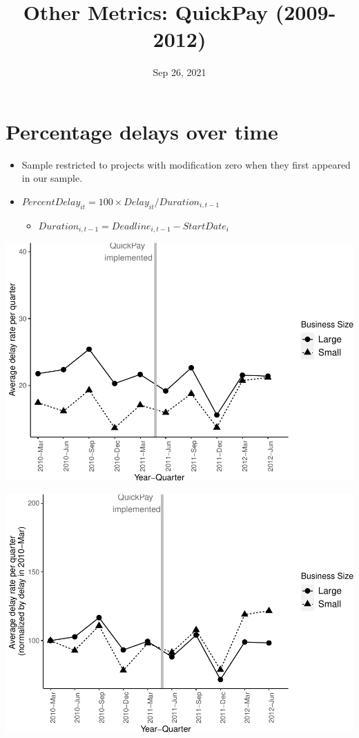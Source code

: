 \documentclass[
]{article}
\title{Other Metrics: QuickPay (2009-2012)}
\author{}
\date{\vspace{-2.5em}Sep 26, 2021}
\providecommand{\tightlist}{%
  \setlength{\itemsep}{0pt}\setlength{\parskip}{0pt}}
\begin{document}
\maketitle

\hypertarget{percentage-delays-over-time}{%
\section{Percentage delays over
time}\label{percentage-delays-over-time}}

\begin{itemize}
\tightlist
\item
  Sample restricted to projects with modification zero when they first
  appeared in our sample.
\item
  \(PercentDelay_{it}=100 \times Delay_{it}/Duration_{i,t-1}\)

  \begin{itemize}
  \tightlist
  \item
    \(Duration_{i,t-1} = Deadline_{i,t-1} - StartDate_i\)
  \end{itemize}
\end{itemize}

\includegraphics{qp_first_pc_delay_files/figure-latex/plot_relative_delay-1.pdf}

\includegraphics{qp_first_pc_delay_files/figure-latex/normalized_plot-1.pdf}
\end{document}
